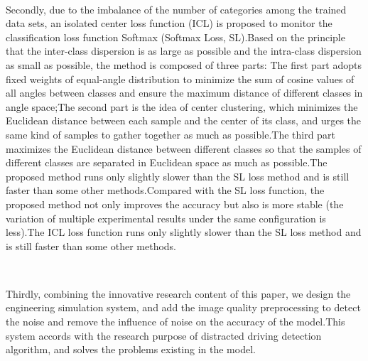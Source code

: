 \begin{englishabstract}
   \par~\par
   Secondly, due to the imbalance of the number of categories among the trained data sets, an isolated center loss function (ICL) is proposed to monitor the classification loss function Softmax (Softmax Loss, SL).Based on the principle that the inter-class dispersion is as large as possible and the intra-class dispersion as small as possible, the method is composed of three parts: The first part adopts fixed weights of equal-angle distribution to minimize the sum of cosine values of all angles between classes and ensure the maximum distance of different classes in angle space;The second part is the idea of center clustering, which minimizes the Euclidean distance between each sample and the center of its class, and urges the same kind of samples to gather together as much as possible.The third part maximizes the Euclidean distance between different classes so that the samples of different classes are separated in Euclidean space as much as possible.The proposed method runs only slightly slower than the SL loss method and is still faster than some other methods.Compared with the SL loss function, the proposed method not only improves the accuracy but also is more stable (the variation of multiple experimental results under the same configuration is less).The ICL loss function runs only slightly slower than the SL loss method and is still faster than some other methods.
   \par~\par
   Thirdly, combining the innovative research content of this paper, we design the engineering simulation system, and add the image quality preprocessing to detect the noise and remove the influence of noise on the accuracy of the model.This system accords with the research purpose of distracted driving detection algorithm, and solves the problems existing in the model.
   

\end{englishabstract}


